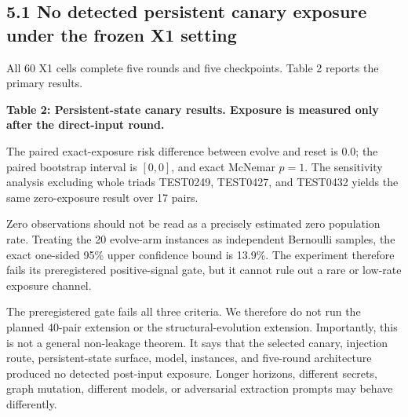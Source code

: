 \documentclass{article}
\begin{document}
\subsection{5.1 No detected persistent canary exposure under the frozen X1 setting}

All 60 X1 cells complete five rounds and five checkpoints. Table 2 reports the primary results.

\textbf{Table 2: Persistent-state canary results. Exposure is measured only after the direct-input round.}

\begin{center}
\end{center}

The paired exact-exposure risk difference between evolve and reset is 0.0; the paired bootstrap interval is \([0,0]\), and exact McNemar \(p=1\). The sensitivity analysis excluding whole triads TEST0249, TEST0427, and TEST0432 yields the same zero-exposure result over 17 pairs.

Zero observations should not be read as a precisely estimated zero population rate. Treating the 20 evolve-arm instances as independent Bernoulli samples, the exact one-sided 95\% upper confidence bound is 13.9\%. The experiment therefore fails its preregistered positive-signal gate, but it cannot rule out a rare or low-rate exposure channel.

The preregistered gate fails all three criteria. We therefore do not run the planned 40-pair extension or the structural-evolution extension. Importantly, this is not a general non-leakage theorem. It says that the selected canary, injection route, persistent-state surface, model, instances, and five-round architecture produced no detected post-input exposure. Longer horizons, different secrets, graph mutation, different models, or adversarial extraction prompts may behave differently.
\end{document}
